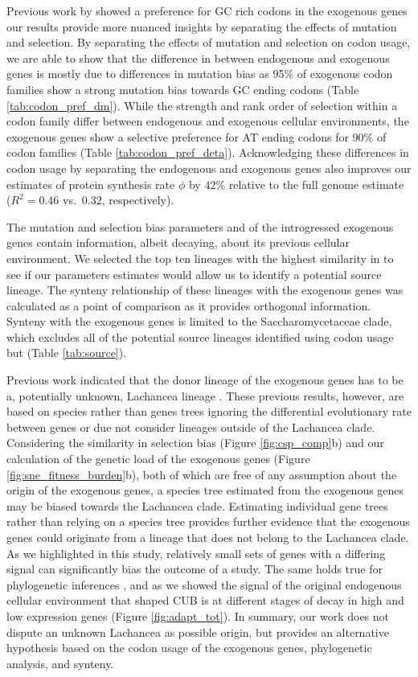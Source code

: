 \documentclass[fleqn,letterpaper]{article}
\begin{document}
Previous work by \citet{payen2009} showed a preference for GC rich codons in the exogenous genes our results provide more nuanced insights by separating the effects of mutation and selection.
By separating the effects of mutation and selection on codon usage, we are able to show that the difference in \GC between endogenous and exogenous genes is mostly due to differences in mutation bias as 95\% of exogenous codon families show a strong mutation bias towards GC ending codons (Table \ref{tab:codon_pref_dm}).
While the strength and rank order of selection within a codon family differ between endogenous and exogenous cellular environments, the exogenous genes show a selective preference for AT ending codons for 90\% of codon families (Table \ref{tab:codon_pref_deta}).
Acknowledging these differences in codon usage by separating the endogenous and exogenous genes also improves our estimates of protein synthesis rate $\phi$ by $42 \%$ relative to the full genome estimate ($R^2 = 0.46$ vs.~$0.32$, respectively).

The mutation and selection bias parameters \DM and \DE of the introgressed exogenous genes contain information, albeit decaying, about its previous cellular environment.
We selected the top ten lineages with the highest similarity in \DM to see if our parameters estimates would allow us to identify a potential source lineage.
The synteny relationship of these lineages with the exogenous genes was calculated as a point of comparison as it provides orthogonal information.
Synteny with the exogenous genes is limited to the Saccharomycetaceae clade, which excludes all of the potential source lineages identified using codon usage but \gossypii (Table \ref{tab:source}).

Previous work indicated that the donor lineage of the exogenous genes has to be a, potentially unknown, Lachancea lineage \citep{payen2009, friedrich2015, vakirlis2016, brion2017}.
These previous results, however, are based on species rather than genes trees ignoring the differential evolutionary rate between genes or due not consider lineages outside of the Lachancea clade.
Considering the similarity in selection bias (Figure \ref{fig:csp_comp}b) and our calculation of the genetic load of the exogenous genes (Figure \ref{fig:sne_fitness_burden}b), both of which are free of any assumption about the origin of the exogenous genes, a species tree estimated from the exogenous genes may be biased towards the Lachancea clade.
Estimating individual gene trees rather than relying on a species tree provides further evidence that the exogenous genes could originate from a lineage that does not belong to the Lachancea clade.
As we highlighted in this study, relatively small sets of genes with a differing signal can significantly bias the outcome of a study. 
The same holds true for phylogenetic inferences \citep{salichos2013}, and as we showed the signal of the original endogenous cellular environment that shaped CUB is at different stages of decay in high and low expression genes (Figure \ref{fig:adapt_tot}).
In summary, our work does not dispute an unknown Lachancea as possible origin, but provides an alternative hypothesis based on the codon usage of the exogenous genes, phylogenetic analysis, and synteny.
\end{document}

